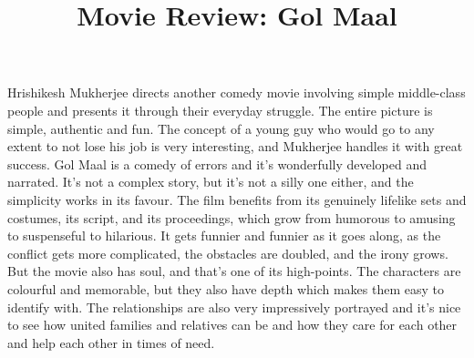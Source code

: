 \documentclass[12pt, a4paper]{article}
\title{Movie Review: Gol Maal}
\author{}
\date{}
\begin{document}
\maketitle
Hrishikesh Mukherjee directs another comedy movie involving simple middle-class people and presents it through their everyday struggle. The entire picture is simple, authentic and fun. The concept of a young guy who would go to any extent to not lose his job is very interesting, and Mukherjee handles it with great success. Gol Maal is a comedy of errors and it's wonderfully developed and narrated. It's not a complex story, but it's not a silly one either, and the simplicity works in its favour. The film benefits from its genuinely lifelike sets and costumes, its script, and its proceedings, which grow from humorous to amusing to suspenseful to hilarious. It gets funnier and funnier as it goes along, as the conflict gets more complicated, the obstacles are doubled, and the irony grows. But the movie also has soul, and that's one of its high-points. The characters are colourful and memorable, but they also have depth which makes them easy to identify with. The relationships are also very impressively portrayed and it's nice to see how united families and relatives can be and how they care for each other and help each other in times of need.
\end{document}
